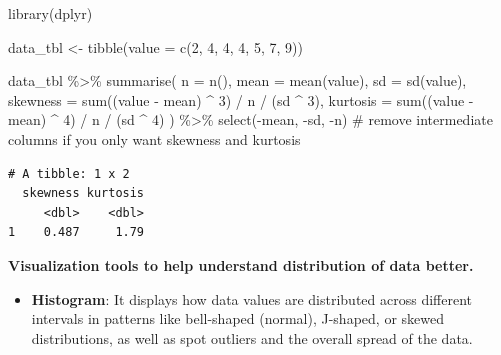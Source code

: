 \documentclass[
  man,
  floatsintext,
  longtable,
  nolmodern,
  notxfonts,
  notimes,
  colorlinks=true,linkcolor=blue,citecolor=blue,urlcolor=blue]{apa7}
\newenvironment{Shaded}{\begin{snugshade}}{\end{snugshade}}
\newcommand{\AttributeTok}[1]{\textcolor[rgb]{0.40,0.45,0.13}{#1}}
\newcommand{\CommentTok}[1]{\textcolor[rgb]{0.37,0.37,0.37}{#1}}
\newcommand{\DecValTok}[1]{\textcolor[rgb]{0.68,0.00,0.00}{#1}}
\newcommand{\FunctionTok}[1]{\textcolor[rgb]{0.28,0.35,0.67}{#1}}
\newcommand{\NormalTok}[1]{\textcolor[rgb]{0.00,0.23,0.31}{#1}}
\newcommand{\OtherTok}[1]{\textcolor[rgb]{0.00,0.23,0.31}{#1}}
\newcommand{\SpecialCharTok}[1]{\textcolor[rgb]{0.37,0.37,0.37}{#1}}
\providecommand{\tightlist}{%
  \setlength{\itemsep}{0pt}\setlength{\parskip}{0pt}}
\begin{document}
\begin{Shaded}
\begin{Highlighting}[]
\FunctionTok{library}\NormalTok{(dplyr)}

\NormalTok{data\_tbl }\OtherTok{\textless{}{-}} \FunctionTok{tibble}\NormalTok{(}\AttributeTok{value =} \FunctionTok{c}\NormalTok{(}\DecValTok{2}\NormalTok{, }\DecValTok{4}\NormalTok{, }\DecValTok{4}\NormalTok{, }\DecValTok{4}\NormalTok{, }\DecValTok{5}\NormalTok{, }\DecValTok{7}\NormalTok{, }\DecValTok{9}\NormalTok{))}

\NormalTok{data\_tbl }\SpecialCharTok{\%\textgreater{}\%}
  \FunctionTok{summarise}\NormalTok{(}
    \AttributeTok{n =} \FunctionTok{n}\NormalTok{(),}
    \AttributeTok{mean =} \FunctionTok{mean}\NormalTok{(value),}
    \AttributeTok{sd =} \FunctionTok{sd}\NormalTok{(value),}
    \AttributeTok{skewness =} \FunctionTok{sum}\NormalTok{((value }\SpecialCharTok{{-}}\NormalTok{ mean) }\SpecialCharTok{\^{}} \DecValTok{3}\NormalTok{) }\SpecialCharTok{/}\NormalTok{ n }\SpecialCharTok{/}\NormalTok{ (sd }\SpecialCharTok{\^{}} \DecValTok{3}\NormalTok{),}
    \AttributeTok{kurtosis =} \FunctionTok{sum}\NormalTok{((value }\SpecialCharTok{{-}}\NormalTok{ mean) }\SpecialCharTok{\^{}} \DecValTok{4}\NormalTok{) }\SpecialCharTok{/}\NormalTok{ n }\SpecialCharTok{/}\NormalTok{ (sd }\SpecialCharTok{\^{}} \DecValTok{4}\NormalTok{)}
\NormalTok{  ) }\SpecialCharTok{\%\textgreater{}\%}
  \FunctionTok{select}\NormalTok{(}\SpecialCharTok{{-}}\NormalTok{mean, }\SpecialCharTok{{-}}\NormalTok{sd, }\SpecialCharTok{{-}}\NormalTok{n) }\CommentTok{\# remove intermediate columns if you only want skewness and kurtosis}
\end{Highlighting}
\end{Shaded}

\begin{verbatim}
# A tibble: 1 x 2
  skewness kurtosis
     <dbl>    <dbl>
1    0.487     1.79
\end{verbatim}

\textbf{Visualization tools to help understand distribution of data
better.}

\begin{itemize}
\tightlist
\item
  \textbf{Histogram}: It displays how data values are distributed across
  different intervals in patterns like bell-shaped (normal), J-shaped,
  or skewed distributions, as well as spot outliers and the overall
  spread of the data.
\end{itemize}
\end{document}
